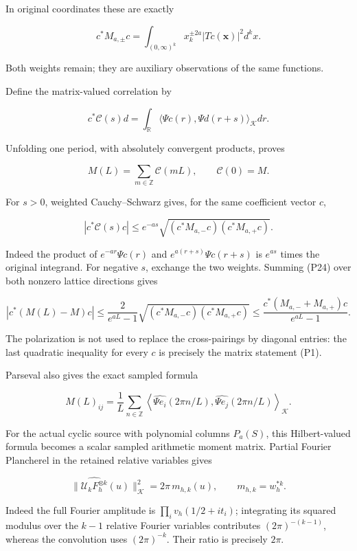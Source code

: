 \documentclass[
]{article}
\begin{document}
In original coordinates these are exactly

\[
c^*M_{a,\pm}c=\int_{(0,\infty)^k}x_k^{\pm2a}|Tc(\mathbf x)|^2d^kx.
\tag{P21}
\]

Both weights remain; they are auxiliary observations of the same
functions.

Define the matrix-valued correlation by

\[
c^*\mathcal C(s)d
=\int_{\mathbb R}\langle\Psi c(r),\Psi d(r+s)\rangle_{\mathcal K}dr.
\tag{P22}
\]

Unfolding one period, with absolutely convergent products, proves

\[
M(L)=\sum_{m\in\mathbb Z}\mathcal C(mL),\qquad \mathcal C(0)=M.
\tag{P23}
\]

For \(s>0\), weighted Cauchy--Schwarz gives, for the same coefficient
vector \(c\),

\[
|c^*\mathcal C(s)c|
\le e^{-as}
\sqrt{(c^*M_{a,-}c)(c^*M_{a,+}c)}.
\tag{P24}
\]

Indeed the product of \(e^{-ar}\Psi c(r)\) and \(e^{a(r+s)}\Psi c(r+s)\)
is \(e^{as}\) times the original integrand. For negative \(s\), exchange
the two weights. Summing (P24) over both nonzero lattice directions
gives

\[
|c^*(M(L)-M)c|
\le\frac{2}{e^{aL}-1}
\sqrt{(c^*M_{a,-}c)(c^*M_{a,+}c)}
\le\frac{c^*(M_{a,-}+M_{a,+})c}{e^{aL}-1}.
\tag{P25}
\]

The polarization is not used to replace the cross-pairings by diagonal
entries: the last quadratic inequality for every \(c\) is precisely the
matrix statement (P1).

Parseval also gives the exact sampled formula

\[
M(L)_{ij}
=\frac1L\sum_{n\in\mathbb Z}
\left\langle\widehat{\Psi e_i}(2\pi n/L),
\widehat{\Psi e_j}(2\pi n/L)\right\rangle_{\mathcal K}.
\tag{P26}
\]

For the actual cyclic source with polynomial columns \(P_a(S)\), this
Hilbert-valued formula becomes a scalar sampled arithmetic moment
matrix. Partial Fourier Plancherel in the retained relative variables
gives

\[
\|\widehat{\mathcal U_kF_h^{\otimes k}}(u)\|_{\mathcal K}^2
=2\pi\,m_{h,k}(u),\qquad m_{h,k}=w_h^{*k}.
\tag{P26a}
\]

Indeed the full Fourier amplitude is \(\prod_i v_h(1/2+it_i)\);
integrating its squared modulus over the \(k-1\) relative Fourier
variables contributes \((2\pi)^{-(k-1)}\), whereas the convolution uses
\((2\pi)^{-k}\). Their ratio is precisely \(2\pi\).
\end{document}
